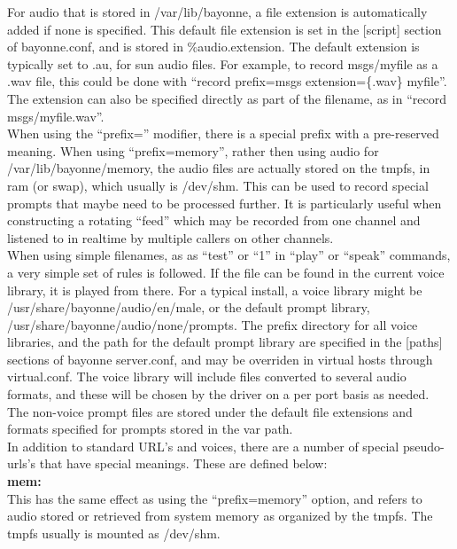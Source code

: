 \documentclass[a4paper,12pt]{article}
\begin{document}
For audio that is stored in /var/lib/bayonne, a file extension is
automatically added if none is specified.  This default file extension
is set in the [script] section of bayonne.conf, and is stored in
\%audio.extension.  The default extension is typically set to .au, for
sun audio files.  For example, to record msgs/myfile as a .wav file, this
could be done with ``record prefix=msgs extension=\{.wav\} myfile''. 
The extension can also be specified directly as part of the filename, as
in ``record msgs/myfile.wav''. \\

When using the ``prefix='' modifier, there is a special prefix with a 
pre-reserved meaning.  When using ``prefix=memory'', rather then using 
audio for /var/lib/bayonne/memory, the audio files are actually stored on
the tmpfs, in ram (or swap), which usually is /dev/shm.  This can be used 
to record special prompts that maybe need to be processed further.  It is 
particularly useful when constructing a rotating ``feed'' which may be 
recorded from one channel and listened to in realtime by multiple callers 
on other channels. \\

When using simple filenames, as as ``test'' or ``1'' in ``play'' or
``speak'' commands, a very simple set of rules is followed.  If the file
can be found in the current voice library, it is played from there.  For
a typical install, a voice library might be /usr/share/bayonne/audio/en/male,
or the default prompt library, /usr/share/bayonne/audio/none/prompts. 
The prefix directory for all voice libraries, and the path for the
default prompt library are specified in the [paths] sections of bayonne
server.conf, and may be overriden in virtual hosts through virtual.conf. 
The voice library will include files converted to several audio formats,
and these will be chosen by the driver on a per port basis as needed. 
The non-voice prompt files are stored under the default file extensions
and formats specified for prompts stored in the var path. \\

In addition to standard URL's and voices, there are a number of special
pseudo-urls's that have special meanings.  These are defined below: \\

{\bf mem:} \\
This has the same effect as using the ``prefix=memory'' option, and refers
to audio stored or retrieved from system memory as organized by the tmpfs.
The tmpfs usually is mounted as /dev/\-shm.
\end{document}
